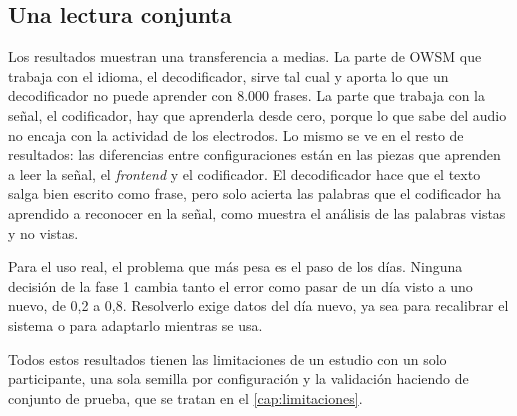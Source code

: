 \subsection{Una lectura conjunta}

Los resultados muestran una transferencia a medias. La parte de OWSM que trabaja con el idioma, el decodificador, sirve tal cual y aporta lo que un decodificador no puede aprender con 8.000 frases. La parte que trabaja con la señal, el codificador, hay que aprenderla desde cero, porque lo que sabe del audio no encaja con la actividad de los electrodos. Lo mismo se ve en el resto de resultados: las diferencias entre configuraciones están en las piezas que aprenden a leer la señal, el \textit{frontend} y el codificador. El decodificador hace que el texto salga bien escrito como frase, pero solo acierta las palabras que el codificador ha aprendido a reconocer en la señal, como muestra el análisis de las palabras vistas y no vistas.

Para el uso real, el problema que más pesa es el paso de los días. Ninguna decisión de la fase 1 cambia tanto el error como pasar de un día visto a uno nuevo, de 0,2 a 0,8. Resolverlo exige datos del día nuevo, ya sea para recalibrar el sistema o para adaptarlo mientras se usa.

Todos estos resultados tienen las limitaciones de un estudio con un solo participante, una sola semilla por configuración y la validación haciendo de conjunto de prueba, que se tratan en el \cref{cap:limitaciones}.
